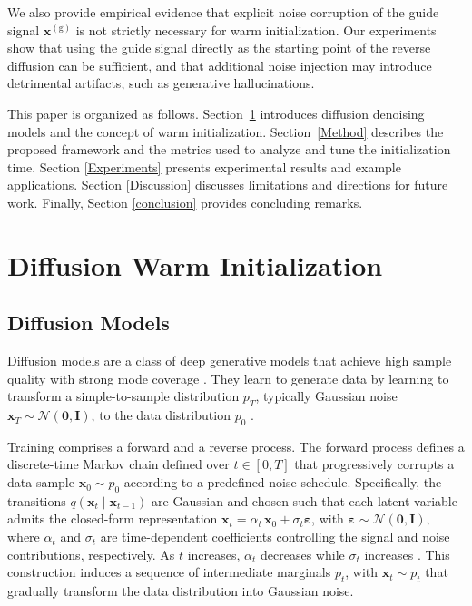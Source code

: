 \documentclass[twoside,a4paper]{article}
\begin{document}
We also provide empirical evidence that explicit noise corruption of the guide signal $\mathbf{x}^{(\mathrm g)}$ is not strictly necessary for warm initialization. Our experiments show that using the guide signal directly as the starting point of the reverse diffusion can be sufficient, and that additional noise injection may introduce detrimental artifacts, such as generative hallucinations.

This paper is organized as follows. Section~\ref{background} introduces diffusion denoising models and the concept of warm initialization. Section~\ref{Method} describes the proposed framework and the metrics used to analyze and tune the initialization time. Section \ref{Experiments} presents experimental results and example applications. Section \ref{Discussion} discusses limitations and directions for future work. Finally, Section \ref{conclusion} provides concluding remarks.


\section{Diffusion Warm Initialization}
\label{background}
\subsection{Diffusion Models}
Diffusion models are a class of deep generative models that achie\-ve high sample quality with strong mode coverage \cite{xiao2022tacklinggenerativelearningtrilemma}. They learn to generate data by learning to transform a simple-to-sample distribution $p_T$, typically Gaussian noise $\mathbf{x}_T \sim \mathcal{N}(\mathbf 0, \mathbf I)$, to the data distribution $p_0$ \cite{ho2020denoisingdiffusionprobabilisticmodels}.

Training comprises a forward and a reverse process.  The forward process defines a discrete-time Markov chain defined over $t \in [0,T]$ that progressively corrupts a data sample $\mathbf{x}_0 \sim p_0$ according to a predefined noise schedule. Specifically, the transitions $q(\mathbf{x}_t \mid \mathbf{x}_{t-1})$ are Gaussian and chosen such that each latent variable admits the closed-form representation
$\mathbf{x}_t = \alpha_t\, \mathbf{x}_0 + \sigma_t \boldsymbol \varepsilon $, with  $\boldsymbol  \varepsilon \sim \mathcal{N}(\mathbf 0, \mathbf I)$,
where $\alpha_t$ and $\sigma_t$ are time-dependent coefficients controlling the signal and noise contributions, respectively. As $t$ increases, $\alpha_t$ decreases while $\sigma_t$ increases \cite{ho2020denoisingdiffusionprobabilisticmodels, song2022denoisingdiffusionimplicitmodels}. This construction induces a sequence of intermediate marginals $p_t$, with $\mathbf{x}_t \sim p_t$ that gradually transform the data distribution into Gaussian noise.
\end{document}
